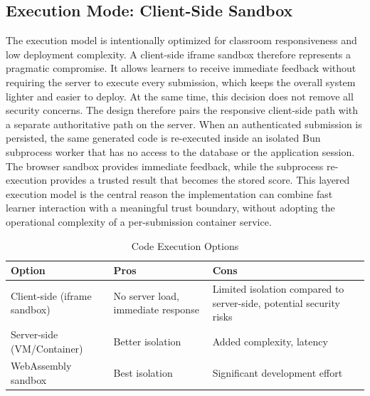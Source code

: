 \subsection{Execution Mode: Client-Side Sandbox}
The execution model is intentionally optimized for classroom responsiveness and low deployment complexity.
A client-side iframe sandbox therefore represents a pragmatic compromise. It allows learners to receive immediate feedback without requiring the server to execute every submission,
which keeps the overall system lighter and easier to deploy.
At the same time, this decision does not remove all security concerns.
The design therefore pairs the responsive client-side path with a separate authoritative path on the server. When an authenticated submission is persisted,
the same generated code is re-executed inside an isolated Bun subprocess worker that has no access to the database or the application session.
The browser sandbox provides immediate feedback, while the subprocess re-execution provides a trusted result that becomes the stored score.
This layered execution model is the central reason the implementation can combine fast learner interaction with a meaningful trust boundary, without adopting the operational
complexity of a per-submission container service.


\begin{table}[h]
  \centering
  \label{tab:code-execution}
  \caption{Code Execution Options}
  \begin{tabularx}{0.9\textwidth}{|l|X|X|}
    \hline
    \textbf{Option}                       & \textbf{Pros}                               & \textbf{Cons}                                                                \\\hline
    Client-side (iframe sandbox) & No server load, immediate response & Limited isolation compared to server-side, potential security risks \\\hline
    Server-side (VM/Container)   & Better isolation                   & Added complexity, latency                                           \\\hline
    WebAssembly sandbox          & Best isolation                     & Significant development effort                                      \\\hline
  \end{tabularx}
\end{table}

